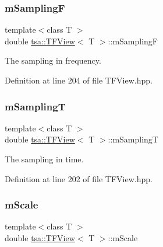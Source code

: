 \subsubsection{\texorpdfstring{m\+SamplingF}{mSamplingF}}
{\footnotesize\ttfamily template$<$class T $>$ \\
double \hyperlink{classtsa_1_1_t_f_view}{tsa\+::\+T\+F\+View}$<$ T $>$\+::m\+SamplingF\hspace{0.3cm}{\ttfamily [protected]}}



The sampling in frequency. 



Definition at line 204 of file T\+F\+View.\+hpp.

\mbox{\label{classtsa_1_1_t_f_view_a0195d10ff8a0c865975f81ea67c64816}} 
\subsubsection{\texorpdfstring{m\+SamplingT}{mSamplingT}}
{\footnotesize\ttfamily template$<$class T $>$ \\
double \hyperlink{classtsa_1_1_t_f_view}{tsa\+::\+T\+F\+View}$<$ T $>$\+::m\+SamplingT\hspace{0.3cm}{\ttfamily [protected]}}



The sampling in time. 



Definition at line 202 of file T\+F\+View.\+hpp.

\mbox{\label{classtsa_1_1_t_f_view_a1f7ed10cd264a12d99744197c134e1bf}} 
\subsubsection{\texorpdfstring{m\+Scale}{mScale}}
{\footnotesize\ttfamily template$<$class T $>$ \\
double \hyperlink{classtsa_1_1_t_f_view}{tsa\+::\+T\+F\+View}$<$ T $>$\+::m\+Scale\hspace{0.3cm}{\ttfamily [protected]}}



